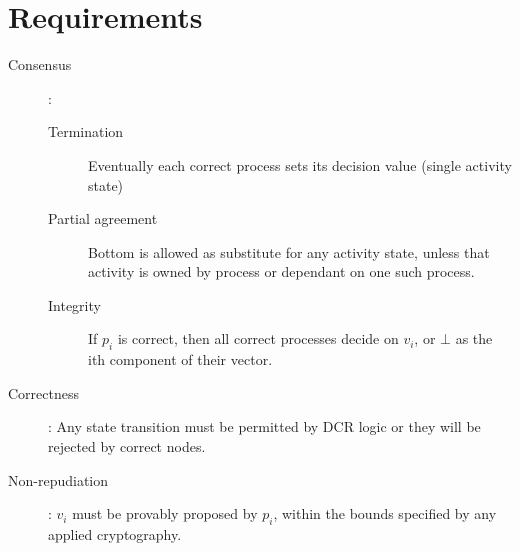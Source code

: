 \documentclass{article}
\begin{document}
	\section*{Requirements}
	\begin{description}
		\item[Consensus]:
			\begin{description}
				\item[Termination] Eventually each correct process sets its decision value (single activity state)
				\item[Partial agreement] %
								Bottom is allowed as substitute for any activity state, unless that activity is owned by process or dependant on one such process. %
				\item[Integrity] If $p_i$ is correct, then all correct processes decide on $v_i$, or $\bot$ as the ith component of their vector. %
			\end{description}
		\item[Correctness]: Any state transition must be permitted by DCR logic or they will be rejected by correct nodes.
		\item[Non-repudiation]: $v_i$ must be provably proposed by $p_i$, within the bounds specified by any applied cryptography.
	\end{description}
\end{document}
